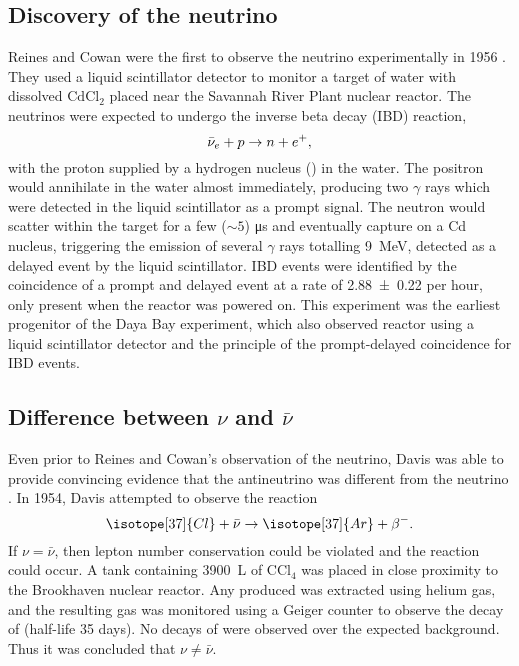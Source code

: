 \subsection{Discovery of the neutrino}
\label{subsec:discovery}

Reines and Cowan were the first to observe the neutrino experimentally in 1956
\cite{reines_cowan}.
They used a liquid scintillator detector to monitor a target of
water with dissolved $\text{CdCl}_2$
placed near the Savannah River Plant nuclear reactor.
The neutrinos were expected to undergo the inverse beta decay (IBD) reaction,
\begin{equation}\label{eq:ibd}
    \bar{\nu}_e + p \to n + e^+,
\end{equation}
with the proton supplied by a hydrogen nucleus () in the water.
The positron would annihilate in the water almost immediately,
producing two $\gamma$ rays which were detected in the liquid scintillator
as a prompt signal.
The neutron would scatter within the target for a few ($\sim5$) \si{\us}
and eventually capture on a Cd nucleus,
triggering the emission of several $\gamma$ rays totalling \SI{9}{\MeV},
detected as a delayed event by the liquid scintillator.
IBD events were identified by the coincidence of a prompt and delayed event
at a rate of \num{2.88\pm0.22} per hour,
only present when the reactor was powered on.
This experiment was the earliest progenitor of the Daya Bay experiment,
which also observed reactor \nuebar{} using a liquid scintillator detector
and the principle of the prompt-delayed coincidence for IBD events.

\subsection{Difference between \texorpdfstring{$\nu$ and $\bar{\nu}$}{nu and nu-bar}}
\label{subsec:nu_vs_nubar}

Even prior to Reines and Cowan's observation of the neutrino,
Davis was able to provide convincing evidence that
the antineutrino was different from the neutrino \cite{davis_diff_nuebar}.
In 1954, Davis attempted to observe the reaction
\begin{equation}\label{eq:davis_nubar}
    \isotope[37]{Cl} + \bar{\nu} \to \isotope[37]{Ar} + \beta^-.
\end{equation}
If $\nu=\bar{\nu}$, then lepton number conservation could be violated
and the reaction could occur.
A tank containing \SI{3900}{\liter} of $\text{CCl}_4$
was placed in close proximity to the Brookhaven nuclear reactor.
Any  produced was extracted using helium gas,
and the resulting gas was monitored using a Geiger counter
to observe the decay of  (half-life 35 days).
No decays of  were observed over the expected background.
Thus it was concluded that $\nu\neq\bar{\nu}$.

